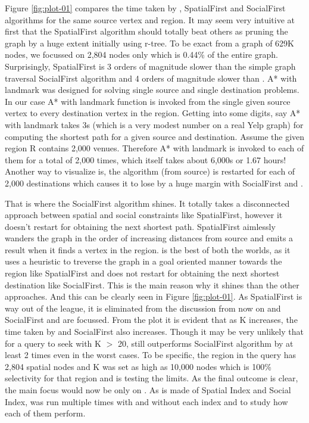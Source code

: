 Figure \ref{fig:plot-01} compares the time taken by {\rrp}, SpatialFirst and SocialFirst algorithms for the same source vertex and region. It may seem very intuitive at first that the SpatialFirst algorithm should totally beat others as pruning the graph by a huge extent initially using r-tree. To be exact from a graph of 629K nodes, we focussed on 2,804 nodes only which is 0.44\% of the entire graph. Surprisingly, SpatialFirst is 3 orders of magnitude slower than the simple graph traversal SocialFirst algorithm and 4 orders of magnitude slower than {\rrp}. A* with landmark was designed for solving single source and single destination problems. In our case A* with landmark function is invoked from the single given source vertex to every destination vertex in the region. Getting into some digits, say A* with landmark takes 3s (which is a very modest number on a real Yelp graph) for computing the shortest path for a given source and destination. Assume the given region R contains 2,000 venues. Therefore A* with landmark is invoked to each of them for a total of 2,000 times, which itself takes about 6,000s or 1.67 hours! Another way to visualize is, the algorithm (from source) is restarted for each of 2,000 destinations which causes it to lose by a huge margin with SocialFirst and {\rrp}.

That is where the SocialFirst algorithm shines. It totally takes a disconnected approach between spatial and social constraints like SpatialFirst, however it doesn't restart for obtaining the next shortest path. SpatialFirst aimlessly wanders the graph in the order of increasing distances from source and emits a result when it finds a vertex in the region. {\rrp} is the best of both the worlds, as it uses a heuristic to treverse the graph in a goal oriented manner towards the region like SpatialFirst and does not restart for obtaining the next shortest destination like SocialFirst. This is the main reason why it shines than the other approaches. And this can be clearly seen in Figure \ref{fig:plot-01}. As SpatialFirst is way out of the league, it is eliminated from the discussion from now on and SocialFirst and {\rrp} are focussed. From the plot it is evident that as K increases, the time taken  by {\rrp} and SocialFirst also increases. Though it may be very unlikely that for a query to seek with K $>$ 20, {\rrp} still outperforms SocialFirst algorithm by at least 2 times even in the worst cases. To be specific, the region in the query has 2,804 spatial nodes and K was set as high as 10,000 nodes which is 100\% selectivity for that region and is testing the limits. As the final outcome is clear, the main focus would now be only on {\rrp}. As {\rrp} is made of Spatial Index and Social Index, {\rrp} was run multiple times with and without each index and to study how each of them perform.

